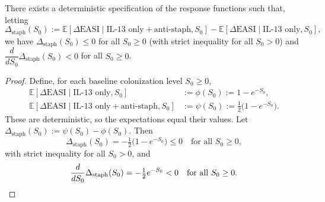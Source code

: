 ﻿\begin{theorem}\label{thm:staph-suppresses-easi}
There exists a deterministic specification of the response functions such that, letting
\[
\Delta_{\mathrm{staph}}(S_0):=\mathbb{E}[\Delta\mathrm{EASI}\mid \text{IL-13 only}{+}\text{anti-staph}, S_0]-\mathbb{E}[\Delta\mathrm{EASI}\mid \text{IL-13 only}, S_0],
\]
we have $\Delta_{\mathrm{staph}}(S_0)\le 0$ for all $S_0\ge 0$ (with strict inequality for all $S_0>0$) and $\dfrac{d}{dS_0}\Delta_{\mathrm{staph}}(S_0)<0$ for all $S_0\ge 0$.
\end{theorem}

\begin{proof}
Define, for each baseline colonization level $S_0\ge 0$,
\begin{equation*}
\begin{aligned}
\mathbb{E}[\Delta\mathrm{EASI}\mid \text{IL-13 only},S_0] &:= \phi(S_0):= 1 - e^{-S_0},\\
\mathbb{E}[\Delta\mathrm{EASI}\mid \text{IL-13 only}{+}\text{anti-staph},S_0] &:= \psi(S_0):= \tfrac12\bigl(1-e^{-S_0}\bigr).
\end{aligned}
\end{equation*}
These are deterministic, so the expectations equal their values. Let $\Delta_{\mathrm{staph}}(S_0):=\psi(S_0)-\phi(S_0)$. Then
\begin{equation*}
\Delta_{\mathrm{staph}}(S_0)= -\tfrac12\bigl(1-e^{-S_0}\bigr)\le 0\quad\text{for all }S_0\ge 0,
\end{equation*}
with strict inequality for all $S_0>0$, and
\begin{equation*}
\frac{d}{dS_0}\Delta_{\mathrm{staph}}(S_0)= -\tfrac12 e^{-S_0}<0\quad\text{for all }S_0\ge 0.\qedhere
\end{equation*}
\end{proof}
